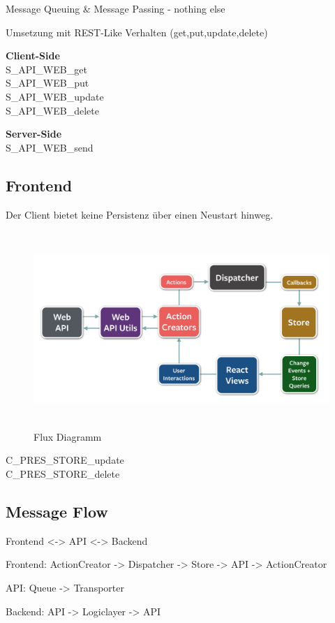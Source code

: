 \documentclass[oneside,11pt,parskip=half,ngerman]{scrreprt}
\makeatletter
\def\maxwidth{\ifdim\Gin@nat@width>\linewidth\linewidth
\else\Gin@nat@width\fi}
\let\Oldincludegraphics\includegraphics
\renewcommand{\includegraphics}[1]{\Oldincludegraphics[width=\maxwidth,height=20em,keepaspectratio]{#1}}
\makeatother
\begin{document}
Message Queuing \& Message Passing - nothing else

Umsetzung mit REST-Like Verhalten (get,put,update,delete)

\textbf{Client-Side}\\S\_API\_WEB\_get\\S\_API\_WEB\_put\\S\_API\_WEB\_update\\S\_API\_WEB\_delete

\textbf{Server-Side}\\S\_API\_WEB\_send

\subsection{Frontend}\label{frontend}

Der Client bietet keine Persistenz über einen Neustart hinweg.

\begin{figure}[htbp]
\centering
\includegraphics{img/flux-diagram.png}
\caption{Flux Diagramm}
\end{figure}

C\_PRES\_STORE\_update\\C\_PRES\_STORE\_delete

\subsection{Message Flow}\label{message-flow}

Frontend \textless{}-\textgreater{} API \textless{}-\textgreater{}
Backend

Frontend: ActionCreator -\textgreater{} Dispatcher -\textgreater{} Store
-\textgreater{} API -\textgreater{} ActionCreator

API: Queue -\textgreater{} Transporter

Backend: API -\textgreater{} Logiclayer -\textgreater{} API
\end{document}
